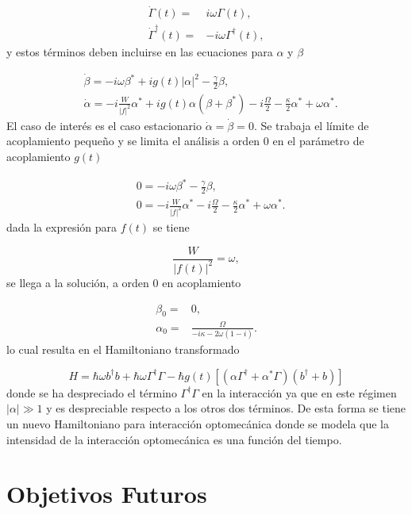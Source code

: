 \documentclass[10pt,a4paper]{report}
\begin{document}
\begin{align}
\dot{\Gamma}(t) =& i\omega \Gamma(t),\\
\dot{\Gamma}^\dagger(t) =& -i\omega \Gamma^\dagger(t),
\end{align} y estos términos deben incluirse en las ecuaciones para $\alpha$ y $\beta$

\begin{align}
&\dot{\beta} = -i\omega\beta^* + ig(t)|\alpha|^2 - \frac{\gamma}{2}\beta,\\
&\dot{\alpha} = -i \frac{W}{|f|^2}\alpha^* + ig(t)\alpha(\beta + \beta^*) -i \frac{\Omega}{2} - \frac{\kappa}{2}\alpha^* + \omega\alpha^*.
\end{align} El caso de interés es el caso estacionario $\dot{\alpha}=\dot{\beta} = 0$. Se trabaja el límite de acoplamiento pequeño y se limita el análisis a orden 0 en el parámetro de acoplamiento $g(t)$

\begin{align}
&0 = -i\omega\beta^* - \frac{\gamma}{2}\beta,\\
&0 = -i \frac{W}{|f|^2}\alpha^* -i \frac{\Omega}{2} - \frac{\kappa}{2}\alpha^* + \omega\alpha^*.
\end{align} dada la expresión para $f(t)$ se tiene

\begin{equation}
\frac{W}{|f(t)|^2} = \omega,
\end{equation} se llega a la solución, a orden 0 en acoplamiento

\begin{align}
\beta_0 =& 0, \\
\alpha_0 =& \frac{\Omega}{-i\kappa - 2\omega(1-i)}.
\end{align} lo cual resulta en el Hamiltoniano transformado

\begin{equation}
H = \hbar \omega b^\dagger b + \hbar\omega \Gamma^\dagger \Gamma -\hbar g(t)[( \alpha \Gamma^{\dagger} + \alpha^* \Gamma)(b^{\dagger}+b)]
\end{equation} donde se ha despreciado el término $\Gamma^{\dagger}\Gamma$ en la interacción ya que en este régimen $|\alpha| \gg 1$ y es despreciable respecto a los otros dos términos. De esta forma se tiene un nuevo Hamiltoniano para interacción optomecánica donde se modela que la intensidad de la interacción optomecánica es una función del tiempo.

\chapter{Objetivos Futuros}
\end{document}
